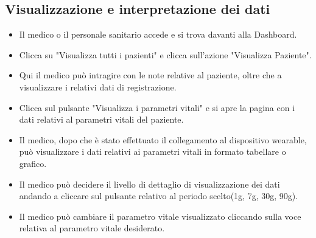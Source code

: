 \documentclass[12pt,a4paper,oneside]{report}
\begin{document}
\subsection{Visualizzazione e interpretazione dei dati}
\begin{itemize}
    \item Il medico o il personale sanitario accede e si trova davanti alla Dashboard.
    \item Clicca su "Visualizza tutti i pazienti" e clicca sull'azione "Visualizza Paziente".
    \item Qui il medico può intragire con le note relative al paziente, oltre che a visualizzare i relativi dati di registrazione.
    \item Clicca sul pulsante "Visualizza i parametri vitali" e si apre la pagina con i dati relativi al parametri vitali del paziente.
    \item Il medico, dopo che è stato effettuato il collegamento al dispositivo wearable, può visualizzare i dati relativi ai parametri vitali in formato tabellare o grafico.
    \item Il medico può decidere il livello di dettaglio di visualizzazione dei dati andando a cliccare sul pulsante relativo al periodo scelto(1g, 7g, 30g, 90g).
    \item Il medico può cambiare il parametro vitale visualizzato cliccando sulla voce relativa al parametro vitale desiderato.
\end{itemize}
\end{document}
